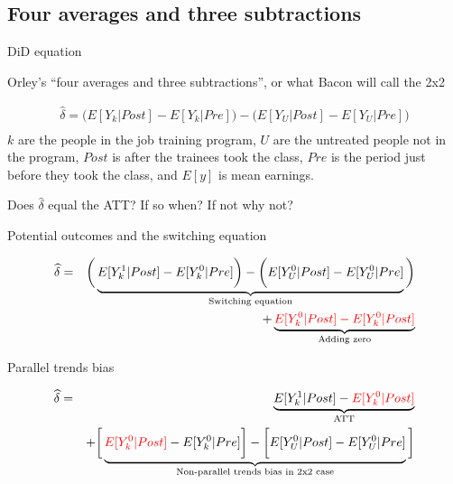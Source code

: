 \documentclass{beamer}
\begin{document}
\subsection{Four averages and three subtractions}


\begin{frame}{DiD equation}

Orley's ``four averages and three subtractions'', or what Bacon will call the 2x2

\begin{eqnarray*}
\widehat{\delta} = \bigg ( E[Y_k|Post] - E[Y_k|Pre] \bigg ) - \bigg ( E[Y_U | Post ] - E[ Y_U | Pre] \bigg) \\
\end{eqnarray*}$k$ are the people in the job training program, $U$ are the untreated people not in the program, $Post$ is after the trainees took the class, $Pre$ is the period just before they took the class, and $E[y]$ is mean earnings. 

\bigskip

Does $\widehat{\delta}$ equal the ATT?  If so when? If not why not?

\end{frame}



\begin{frame}{Potential outcomes and the switching equation}

\begin{eqnarray*}
\widehat{\delta} &=& \bigg ( \underbrace{E[Y^1_k|Post] - E[Y^0_k|Pre] \bigg ) - \bigg ( E[Y^0_U | Post ] - E[ Y^0_U | Pre]}_{\mathclap{\text{Switching equation}}} \bigg)  \\
&&+ \underbrace{\textcolor{red}{E[Y_k^0 |Post] - E[Y^0_k | Post]}}_{\mathclap{\text{Adding zero}}} 
\end{eqnarray*}

\end{frame}

\begin{frame}{Parallel trends bias}

\begin{eqnarray*}
\widehat{\delta} &=& \underbrace{E[Y^1_k | Post] - \textcolor{red}{E[Y^0_k | Post]}}_{\mathclap{\text{ATT}}} \\
&& + \bigg [  \underbrace{\textcolor{red}{E[Y^0_k | Post]} - E[Y^0_k | Pre] \bigg ] - \bigg [ E[Y^0_U | Post] - E[Y_U^0 | Pre] }_{\mathclap{\text{Non-parallel trends bias in 2x2 case}}} \bigg ]
\end{eqnarray*}


\end{frame}
\end{document}
